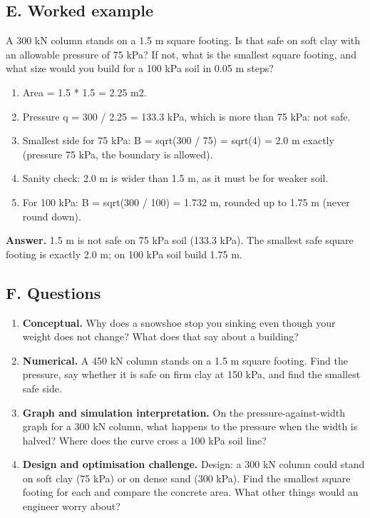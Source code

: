 \documentclass[11pt,a4paper]{article}
\begin{document}
\subsection*{E. Worked example}
A 300 kN column stands on a 1.5 m square footing. Is that safe on soft clay with an allowable pressure of 75 kPa? If not, what is the smallest square footing, and what size would you build for a 100 kPa soil in 0.05 m steps?
\begin{enumerate}[nosep]
\item Area = 1.5 * 1.5 = 2.25 m2.
\item Pressure q = 300 / 2.25 = 133.3 kPa, which is more than 75 kPa: not safe.
\item Smallest side for 75 kPa: B = sqrt(300 / 75) = sqrt(4) = 2.0 m exactly (pressure 75 kPa, the boundary is allowed).
\item Sanity check: 2.0 m is wider than 1.5 m, as it must be for weaker soil.
\item For 100 kPa: B = sqrt(300 / 100) = 1.732 m, rounded up to 1.75 m (never round down).
\end{enumerate}
\textbf{Answer.} 1.5 m is not safe on 75 kPa soil (133.3 kPa). The smallest safe square footing is exactly 2.0 m; on 100 kPa soil build 1.75 m.

\subsection*{F. Questions}
\begin{enumerate}[nosep]
\item \textbf{Conceptual.} Why does a snowshoe stop you sinking even though your weight does not change? What does that say about a building?
\item \textbf{Numerical.} A 450 kN column stands on a 1.5 m square footing. Find the pressure, say whether it is safe on firm clay at 150 kPa, and find the smallest safe side.
\item \textbf{Graph and simulation interpretation.} On the pressure-against-width graph for a 300 kN column, what happens to the pressure when the width is halved? Where does the curve cross a 100 kPa soil line?
\item \textbf{Design and optimisation challenge.} Design: a 300 kN column could stand on soft clay (75 kPa) or on dense sand (300 kPa). Find the smallest square footing for each and compare the concrete area. What other things would an engineer worry about?
\end{enumerate}
\end{document}
